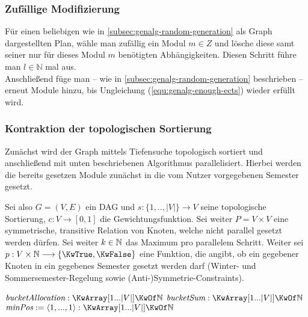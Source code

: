 \subsubsection{Zufällige Modifizierung}
\label{subsec:genalg-random-modification}
Für einen beliebigen wie in \ref{subsec:genalg-random-generation} als Graph dargestellten Plan, wähle man zufällig ein Modul $m \in Z$ und lösche diese samt seiner nur für dieses Modul $m$ benötigten Abhängigkeiten. Diesen Schritt führe man $l \in \mathbb{N}$ mal aus.\\
Anschließend füge man -- wie in \ref{subsec:genalg-random-generation} beschrieben -- erneut Module hinzu, bis Ungleichung (\ref{equ:genalg-enough-ects}) wieder erfüllt wird.

\subsubsection{Kontraktion der topologischen Sortierung}
\label{subsec:genalg-contract-topolog-sort}
Zunächst wird der Graph mittels Tiefensuche topologisch sortiert und
anschließend  mit unten beschriebenen Algorithmus parallelisiert.
Hierbei werden die bereits gesetzen Module zunächst in die vom Nutzer vorgegebenen Semester gesetzt.

Sei also $G = (V,E)$ ein DAG und $s: \{1,..,|V|\} \to V$ seine topologische Sortierung, $c: V \to [0,1]$ die Gewichtungsfunktion. Sei weiter $P = V \times V$ eine symmetrische, transitive Relation von Knoten, welche nicht parallel gesetzt werden dürfen.
Sei weiter $ k \in \mathbb{N} $ das Maximum pro parallelem Schritt.
Weiter sei $ p: V \times \NN \to \{\KwTrue, \KwFalse\} $ eine Funktion, die angibt, ob ein gegebener Knoten in ein gegebenes Semester gesetzt werden darf (Winter- und Sommersemester-Regelung sowie (Anti-)Symmetrie-Constraints).

\begin{algorithm}
	$\Var{bucketAllocation} : \KwArray [1...|V|] \KwOf \NN $ \;
	$\Var{bucketSum} : \KwArray [1...|V|] \KwOf \NN $ \;
	$\Var{minPos} := \langle 1,...,1 \rangle: \KwArray [1...|V|] \KwOf \NN $ \;
	\BlankLine
\end{algorithm}

